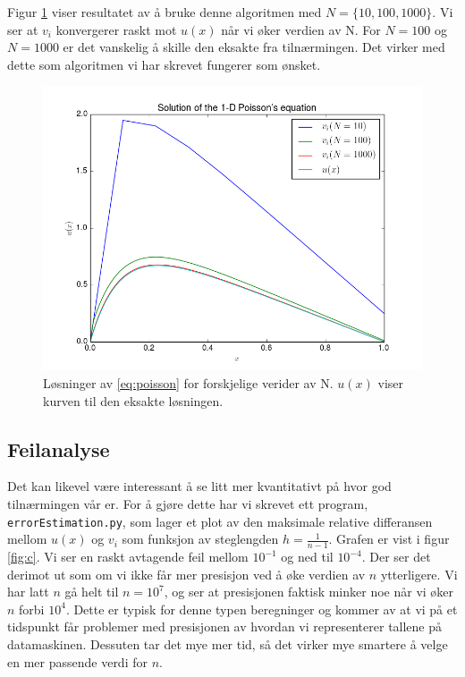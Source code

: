 \documentclass[11pt]{article}
\begin{document}
Figur \ref{fig:b} viser resultatet av å bruke denne algoritmen med
$N = \{10,100,1000\}$. Vi ser at $v_i$ konvergerer raskt mot $u(x)$
når vi øker verdien av N. For $N=100$ og $N=1000$ er det vanskelig å
skille den eksakte fra tilnærmingen. Det virker med dette som
algoritmen vi har skrevet fungerer som ønsket.

\begin{figure}[ht]
  \centering
  \includegraphics[scale=0.7]{fig/b.png}
  \caption{\label{fig:b} Løsninger av \eqref{eq:poisson} for
    forskjelige verider av N. $u(x)$ viser kurven til den eksakte løsningen.}
\end{figure}

\subsection{Feilanalyse}
Det kan likevel være interessant å se litt mer kvantitativt på hvor
god tilnærmingen vår er. For å gjøre dette har vi skrevet ett program,
\texttt{errorEstimation.py}, som lager et plot av den maksimale
relative differansen mellom $u(x)$ og $v_i$ som funksjon av
steglengden $h = \frac{ 1 }{ n-1 }$. Grafen er vist i figur
\ref{fig:c}. Vi ser en raskt avtagende feil mellom $10^{-1}$ og ned
til $10^{-4}$. Der ser det derimot ut som om vi ikke får mer presisjon
ved å øke verdien av $n$ ytterligere. Vi har latt $n$ gå helt til
$n=10^7$, og ser at presisjonen faktisk minker noe når vi øker $n$
forbi $10^4$. Dette er typisk for denne typen beregninger og kommer av
at vi på et tidspunkt får problemer med presisjonen av hvordan vi
representerer tallene på datamaskinen. Dessuten tar det mye mer tid,
så det virker mye smartere å velge en mer passende verdi for $n$. 
\end{document}

